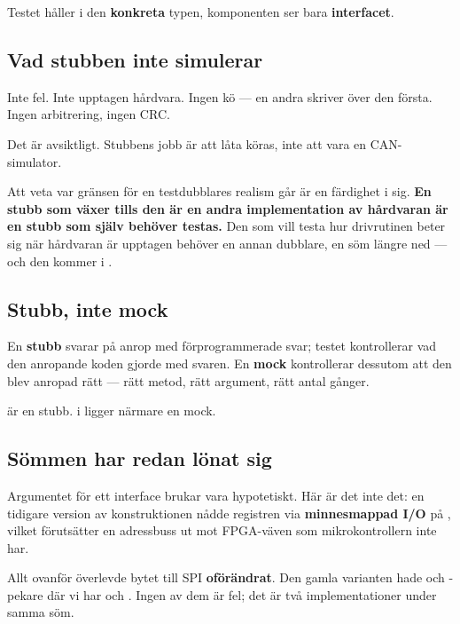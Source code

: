 Testet håller i den \textbf{konkreta} typen, komponenten ser bara \textbf{interfacet}.

\subsection{Vad stubben inte simulerar}

Inte fel. Inte upptagen hårdvara. Ingen kö --- en andra  skriver över den första.
Ingen arbitrering, ingen CRC.

Det är avsiktligt. Stubbens jobb är att låta  köras, inte att vara en
CAN-simulator.

\begin{aside}
\note Att veta var gränsen för en testdubblares realism går är en färdighet i sig. \textbf{En
stubb som växer tills den är en andra implementation av hårdvaran är en stubb som själv behöver
testas.} Den som vill testa hur drivrutinen beter sig när hårdvaran är upptagen behöver en annan
dubblare, en söm längre ned --- och den kommer i .
\end{aside}

\subsection{Stubb, inte mock}

En \textbf{stubb} svarar på anrop med förprogrammerade svar; testet kontrollerar vad den anropande
koden gjorde med svaren. En \textbf{mock} kontrollerar dessutom att den blev anropad rätt --- rätt
metod, rätt argument, rätt antal gånger.

 är en stubb.  i  ligger närmare en mock.

\subsection{Sömmen har redan lönat sig}

Argumentet för ett interface brukar vara hypotetiskt. Här är det inte det: en tidigare version av
konstruktionen nådde registren via \textbf{minnesmappad I/O} på , vilket
förutsätter en adressbuss ut mot FPGA-väven som mikrokontrollern inte har.

Allt ovanför  överlevde bytet till SPI \textbf{oförändrat}. Den gamla varianten
hade  och -pekare där vi har  och . Ingen
av dem är fel; det är två implementationer under samma söm.
